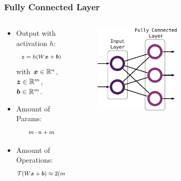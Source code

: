 \begin{frame}
  \frametitle{Fully Connected Layer}
  \begin{columns}
    \begin{column}{0.45\textwidth}
      \begin{itemize}
        \item Output with activation $h$:
        \begin{equation*}
          \footnotesize
          \begin{aligned}
            \bm{z} = h(W \bm{x} + \bm{b})
          \end{aligned}
        \end{equation*}
        {\scriptsize with $\bm{x} \in \mathbb{R}^n$, $\bm{z} \in \mathbb{R}^m$, $\bm{b} \in \mathbb{R}^m$.}
        \vspace{0.2cm}
        \item Amount of Params:
        \begin{equation*}
          \footnotesize
          \begin{aligned}
            m \cdot n + m
          \end{aligned}
        \end{equation*}
        \item Amount of Operations:
        \begin{equation*}
          \footnotesize
          \begin{aligned}
            \mathcal{T}(W \bm{x} + \bm{b}) \approx 2 (m \cdot n) + m
          \end{aligned}
        \end{equation*}     
      \end{itemize}
    \end{column}
    \begin{column}{0.55\textwidth}
      \vspace{0.75cm}
      \centering
      \begin{figure} \includegraphics[width=0.55\textwidth]{../4_nn/figs/nn_theory_fc.pdf} \end{figure}
      \vfill
    \end{column}
  \end{columns}
\end{frame}

